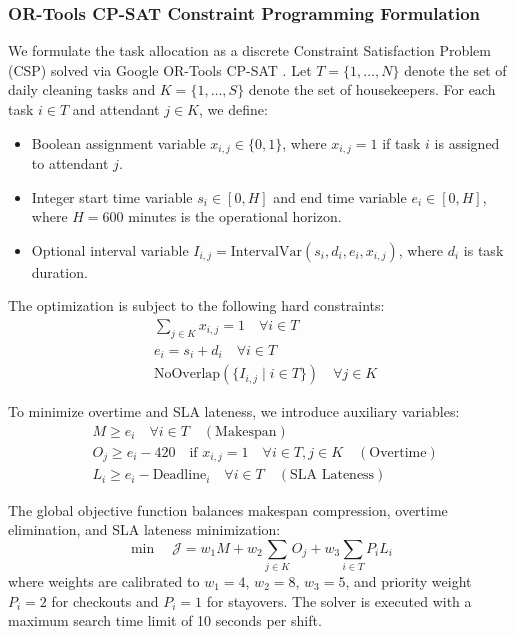 \documentclass[11pt,a4paper]{article}
\begin{document}
\subsubsection{OR-Tools CP-SAT Constraint Programming Formulation}
We formulate the task allocation as a discrete Constraint Satisfaction Problem (CSP) solved via Google OR-Tools CP-SAT \cite{perron2011,ortools2024}. Let $T = \{1, \dots, N\}$ denote the set of daily cleaning tasks and $K = \{1, \dots, S\}$ denote the set of housekeepers. For each task $i \in T$ and attendant $j \in K$, we define:
\begin{itemize}
    \item Boolean assignment variable $x_{i,j} \in \{0, 1\}$, where $x_{i,j} = 1$ if task $i$ is assigned to attendant $j$.
    \item Integer start time variable $s_i \in [0, H]$ and end time variable $e_i \in [0, H]$, where $H = 600$ minutes is the operational horizon.
    \item Optional interval variable $I_{i,j} = \text{IntervalVar}(s_i, d_i, e_i, x_{i,j})$, where $d_i$ is task duration.
\end{itemize}

The optimization is subject to the following hard constraints:
\begin{align}
& \sum_{j \in K} x_{i,j} = 1 \quad \forall i \in T \label{eq:exact_one_staff} \\
& e_i = s_i + d_i \quad \forall i \in T \label{eq:duration_relation} \\
& \text{NoOverlap}\left(\{I_{i,j} \mid i \in T\}\right) \quad \forall j \in K \label{eq:no_overlap}
\end{align}

To minimize overtime and SLA lateness, we introduce auxiliary variables:
\begin{align}
& M \ge e_i \quad \forall i \in T \quad (\text{Makespan}) \label{eq:makespan} \\
& O_j \ge e_i - 420 \quad \text{if } x_{i,j} = 1 \quad \forall i \in T, j \in K \quad (\text{Overtime}) \label{eq:overtime} \\
& L_i \ge e_i - \text{Deadline}_i \quad \forall i \in T \quad (\text{SLA Lateness}) \label{eq:lateness}
\end{align}

The global objective function balances makespan compression, overtime elimination, and SLA lateness minimization:
\begin{equation}
\min \quad \mathcal{J} = w_1 M + w_2 \sum_{j \in K} O_j + w_3 \sum_{i \in T} P_i L_i
\label{eq:objective}
\end{equation}
where weights are calibrated to $w_1 = 4$, $w_2 = 8$, $w_3 = 5$, and priority weight $P_i = 2$ for checkouts and $P_i = 1$ for stayovers. The solver is executed with a maximum search time limit of 10 seconds per shift.
\end{document}
